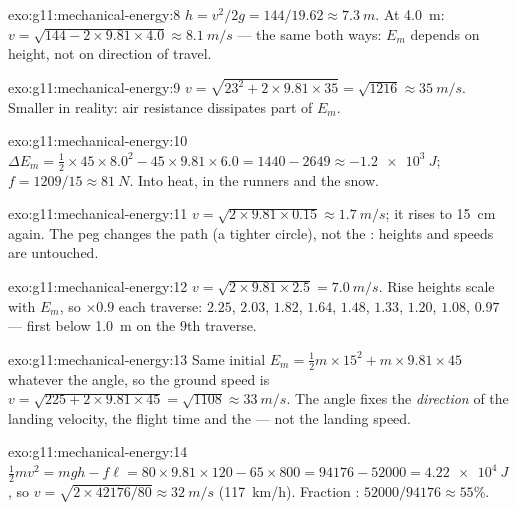 \begin{solution}{exo:g11:mechanical-energy:8}
$h = v^2/2g = 144/19.62 \approx \qty{7.3}{m}$. At \qty{4.0}{m}:
$v = \sqrt{144 - 2 \times 9.81 \times 4.0} \approx \qty{8.1}{m/s}$ ---
the same both ways: $E_m$ depends on height, not on direction of travel.
\end{solution}

\begin{solution}{exo:g11:mechanical-energy:9}
$v = \sqrt{23^2 + 2 \times 9.81 \times 35} = \sqrt{1216} \approx
\qty{35}{m/s}$. Smaller in reality: air resistance dissipates part of
$E_m$.
\end{solution}

\begin{solution}{exo:g11:mechanical-energy:10}
$\Delta E_m = \tfrac12 \times 45 \times 8.0^2 - 45 \times 9.81 \times
6.0 = 1440 - 2649 \approx \qty{-1.2e3}{J}$;
$f = 1209/15 \approx \qty{81}{N}$. Into heat, in the runners and the
snow.
\end{solution}

\begin{solution}{exo:g11:mechanical-energy:11}
$v = \sqrt{2 \times 9.81 \times 0.15} \approx \qty{1.7}{m/s}$; it rises
to \qty{15}{cm} again. The peg changes the path (a tighter circle), not
the : heights and speeds are untouched.
\end{solution}

\begin{solution}{exo:g11:mechanical-energy:12}
$v = \sqrt{2 \times 9.81 \times 2.5} = \qty{7.0}{m/s}$. Rise heights
scale with $E_m$, so $\times 0.9$ each traverse: $2.25$, $2.03$, $1.82$,
$1.64$, $1.48$, $1.33$, $1.20$, $1.08$, $0.97$ --- first below
\qty{1.0}{m} on the $9$th traverse.
\end{solution}

\begin{solution}{exo:g11:mechanical-energy:13}
Same initial $E_m = \tfrac12 m \times 15^2 + m \times 9.81 \times 45$
whatever the angle, so the ground speed is
$v = \sqrt{225 + 2 \times 9.81 \times 45} = \sqrt{1108} \approx
\qty{33}{m/s}$. The angle fixes the \emph{direction} of the landing
velocity, the flight time and the  --- not the landing speed.
\end{solution}

\begin{solution}{exo:g11:mechanical-energy:14}
$\tfrac12 mv^2 = mgh - f\ell = 80 \times 9.81 \times 120 - 65 \times
800 = \num{94176} - \num{52000} = \qty{4.22e4}{J}$, so
$v = \sqrt{2 \times \num{42176}/80} \approx \qty{32}{m/s}$
(\qty{117}{km/h}). Fraction : $52000/94176 \approx 55\%$.
\end{solution}

